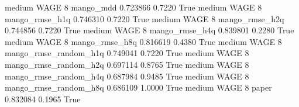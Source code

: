    medium     WAGE                 8             mango_mdd   0.723866      0.7220    True
    medium     WAGE                 8        mango_rmse_h1q   0.746310      0.7220    True
    medium     WAGE                 8        mango_rmse_h2q   0.744856      0.7220    True
    medium     WAGE                 8        mango_rmse_h4q   0.839801      0.2280    True
    medium     WAGE                 8        mango_rmse_h8q   0.816619      0.4380    True
    medium     WAGE                 8 mango_rmse_random_h1q   0.749041      0.7220    True
    medium     WAGE                 8 mango_rmse_random_h2q   0.697114      0.8765    True
    medium     WAGE                 8 mango_rmse_random_h4q   0.687984      0.9485    True
    medium     WAGE                 8 mango_rmse_random_h8q   0.686109      1.0000    True
    medium     WAGE                 8                 paper   0.832084      0.1965    True